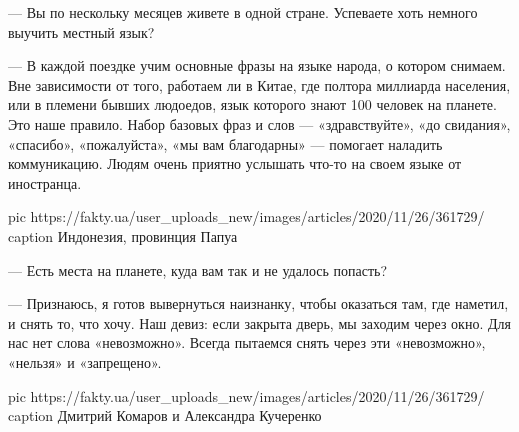 --- Вы по нескольку месяцев живете в одной стране. Успеваете хоть немного
выучить местный язык?

--- В каждой поездке учим основные фразы на языке народа, о котором снимаем.
Вне зависимости от того, работаем ли в Китае, где полтора миллиарда
населения, или в племени бывших людоедов, язык которого знают 100 человек
на планете. Это наше правило. Набор базовых фраз и слов --- «здравствуйте»,
«до свидания», «спасибо», «пожалуйста», «мы вам благодарны» --- помогает
наладить коммуникацию. Людям очень приятно услышать что-то на своем языке
от иностранца.

\ifcmt
pic https://fakty.ua/user_uploads_new/images/articles/2020/11/26/361729/%
caption Индонезия, провинция Папуа
\fi


--- Есть места на планете, куда вам так и не удалось попасть?

--- Признаюсь, я готов вывернуться наизнанку, чтобы оказаться там, где
наметил, и снять то, что хочу. Наш девиз: если закрыта дверь, мы заходим
через окно. Для нас нет слова «невозможно». Всегда пытаемся снять через
эти «невозможно», «нельзя» и «запрещено».

\ifcmt
pic https://fakty.ua/user_uploads_new/images/articles/2020/11/26/361729/%
caption Дмитрий Комаров и Александра Кучеренко
\fi




